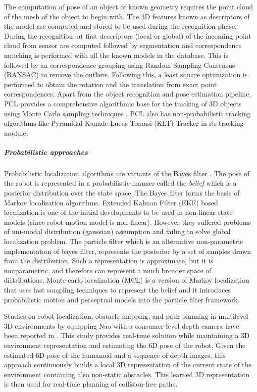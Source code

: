 The computation of pose of an object of known geometry requires the point cloud of the mesh of the object to begin with. The 3D features known as descriptors of the model are computed and stored to be used during the recognition phase.  During the recognition, at first descriptors (local or global) of the incoming point cloud from sensor are computed followed by segmentation and correspondence matching is performed with all the known models in the database. This is followed by an correspondence grouping using Random Sampling Consensus (RANSAC) to remove the outliers. Following this, a least square optimization is performed to obtain the rotation and the translation from exact point correspondences. Apart from the object recognition and pose estimation pipeline, PCL provides a comprehensive algorithmic base for the tracking of 3D objects using Monte Carlo sampling techniques \cite{RUeda2012}. PCL also has non-probabilistic tracking algorithms like Pyramidal Kanade Lucas Tomasi (KLT) Tracker in its tracking module.
\subparagraph{Probabilistic approaches}
\label{ssec:prob_approaches}
Probabilistic localization algorithms are variants of the Bayes filter \cite{thrun2005probabilistic}. The pose of the robot is represented in a probabilistic manner called the \emph{belief} which is a posterior distribution over the state space. The Bayes filter \cite{thrun2005probabilistic} forms the basis of Markov localization algorithms. Extended Kalman Filter (EKF) based localization is one of the initial developments to be used in non-linear state models (since robot motion model is non-linear). However they suffered problems of uni-modal distribution (gaussian) assumption and failing to solve global localization problem. The particle filter \cite{thrun2005probabilistic} which is an alternative non-parametric implementation of bayes filter, represents the posterior by a set of samples drawn from the distribution. Such a representation is approximate, but it is nonparametric, and therefore can represent a much broader space of distributions. Monte-carlo localization (MCL) \cite{fox1999monte} is a version of Markov localization that uses fast sampling techniques to represent the belief and it introduces probabilistic motion and perceptual models into the particle filter framework.
	
Studies on robot localization, obstacle mapping, and path planning in multilevel 3D environments by equipping Nao with a consumer-level depth camera have been reported in \cite{maier2012real}. This study provides real-time solution while maintaining a 3D environment representation and estimating the 6D pose of the robot. Given the estimated 6D pose of the humanoid and a sequence of depth images, this approach continuously builds a local 3D representation of the current state of the environment containing also non-static obstacles. This learned 3D representation is then used for real-time planning of collision-free paths. 
	
